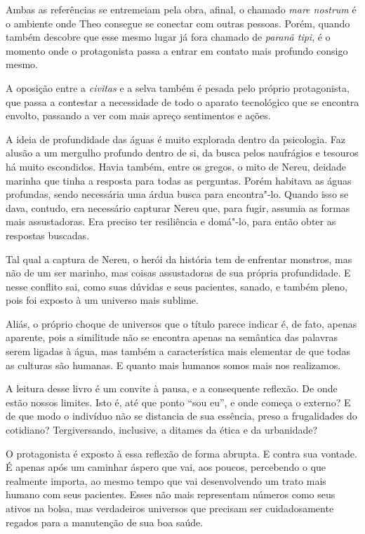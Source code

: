 Ambas as referências se entremeiam pela obra, afinal, o chamado \textit{mare
nostrum} é o ambiente onde Theo consegue se conectar com outras pessoas.
Porém, quando também descobre que esse mesmo lugar já fora chamado de
\textit{paranã tipi}, é o momento onde o protagonista passa a entrar em contato
mais profundo consigo mesmo.

A oposição entre a \textit{civitas} e a selva também é pesada pelo próprio
protagonista, que passa a contestar a necessidade de todo o aparato
tecnológico que se encontra envolto, passando a ver com mais apreço
sentimentos e ações.

A ideia de profundidade das águas é muito explorada dentro da
psicologia. Faz alusão a um mergulho profundo dentro de si, da busca
pelos naufrágios e tesouros há muito escondidos. Havia também, entre os
gregos, o mito de Nereu, deidade marinha que tinha a resposta para todas
as perguntas. Porém habitava as águas profundas, sendo necessária uma
árdua busca para encontra"-lo. Quando isso se dava, contudo, era
necessário capturar Nereu que, para fugir, assumia as formas mais
assustadoras. Era preciso ter resiliência e domá"-lo, para então obter as
respostas buscadas.

Tal qual a captura de Nereu, o herói da história tem de enfrentar
monstros, mas não de um ser marinho, mas coisas assustadoras de sua
própria profundidade. E nesse conflito sai, como suas dúvidas e seus
pacientes, sanado, e também pleno, pois foi exposto à um universo mais
sublime.

Aliás, o próprio choque de universos que o título parece indicar é, de
fato, apenas aparente, pois a similitude não se encontra apenas na
semântica das palavras serem ligadas à água, mas também a característica
mais elementar de que todas as culturas são humanas. E quanto mais
humanos somos mais nos realizamos.

A leitura desse livro é um convite à pausa, e a consequente reflexão. De
onde estão nossos limites. Isto é, até que ponto ``sou eu'', e onde
começa o externo? E de que modo o indivíduo não se distancia de sua
essência, preso a frugalidades do cotidiano? Tergiversando, inclusive, a
ditames da ética e da urbanidade?

O protagonista é exposto à essa reflexão de forma abrupta. E contra sua
vontade. É apenas após um caminhar áspero que vai, aos poucos,
percebendo o que realmente importa, ao mesmo tempo que vai desenvolvendo
um trato mais humano com seus pacientes. Esses não mais representam
números como seus ativos na bolsa, mas verdadeiros universos que
precisam ser cuidadosamente regados para a manutenção de sua boa saúde.

